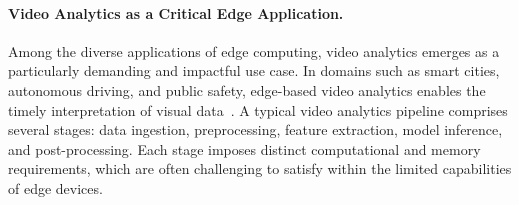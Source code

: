 \paragraph{Video Analytics as a Critical Edge Application.}
Among the diverse applications of edge computing, video analytics emerges as a particularly demanding and impactful use case. In domains such as smart cities, autonomous driving, and public safety, edge-based video analytics enables the timely interpretation of visual data~\cite{hu2023edge,xu2023edge}. A typical video analytics pipeline comprises several stages: data ingestion, preprocessing, feature extraction, model inference, and post-processing. Each stage imposes distinct computational and memory requirements, which are often challenging to satisfy within the limited capabilities of edge devices.


